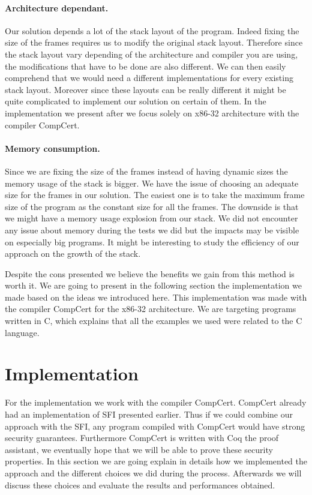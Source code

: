 \documentclass[11pt]{sdm}
\begin{document}
\paragraph{Architecture dependant.}
\label{par:Architecture dependant}
Our solution depends a lot of the stack layout of the program.
Indeed fixing the size of the frames requires us to modify the original stack layout.
Therefore since the stack layout vary depending of the architecture and compiler you are using, the modifications that have to be done are also different.
We can then easily comprehend that we would need a different implementations for every existing stack layout.
Moreover since these layouts can be really different it might be quite complicated to implement our solution on certain of them.
In the implementation we present after we focus solely on x86-32 architecture with the compiler CompCert.

\paragraph{Memory consumption.}
\label{par:Memory consumption}
Since we are fixing the size of the frames instead of having dynamic sizes the memory usage of the stack is bigger. We have the issue of choosing an adequate size for the frames in our solution. The easiest one is to take the maximum frame size of the program as the constant size for all the frames. The downside is that we might have a memory usage explosion from our stack.
We did not encounter any issue about memory during the tests we did but the impacts may be visible on especially big programs. It might be interesting to study the efficiency of our approach on the growth of the stack.

Despite the cons presented we believe the benefits we gain from this method is worth it.
We are going to present in the following section the implementation we made based on the ideas we introduced here. This implementation was made with the compiler CompCert for the x86-32 architecture. We are targeting programs written in C, which explains that all the examples we used were related to the C language.


\newpage
\section{Implementation}
\label{sec:implementation}

For the implementation we work with the compiler CompCert. CompCert already had an implementation of SFI presented earlier. Thus if we could combine our approach with the SFI, any program compiled with CompCert would have strong security guarantees. Furthermore CompCert is written with Coq the proof assistant, we eventually hope that we will be able to prove these security properties. In this section we are going explain in details how we implemented the approach and the different choices we did during the process. Afterwards we will discuss these choices and evaluate the results and performances obtained.
\end{document}
